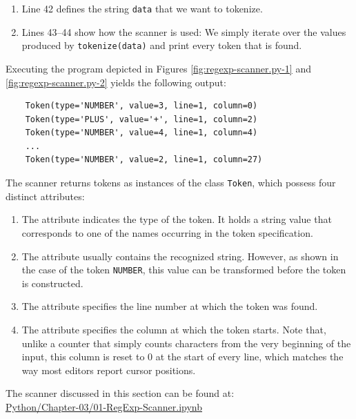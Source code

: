 \begin{enumerate}
\begin{enumerate}
            the next match.
      \item Lines 38--39 deal with the token \texttt{MISMATCH}: an exception is raised that reports the illegal
            character together with the line and column at which it was found.
      \item Line 40 is only reached for genuine tokens.  It constructs a \texttt{Token} object and
            \texttt{yield}s it to the caller.
      \end{enumerate}
\item Line 42 defines the string \texttt{data} that we want to tokenize.
\item Lines 43--44 show how the scanner is used: We simply iterate over the values produced by
      \texttt{tokenize(data)} and print every token that is found.
\end{enumerate}

\noindent
Executing the program depicted in Figures \ref{fig:regexp-scanner.py-1}  and \ref{fig:regexp-scanner.py-2}
yields the following output: 

\begin{verbatim}
    Token(type='NUMBER', value=3, line=1, column=0)
    Token(type='PLUS', value='+', line=1, column=2)
    Token(type='NUMBER', value=4, line=1, column=4)
    ...
    Token(type='NUMBER', value=2, line=1, column=27)
\end{verbatim}
The scanner returns tokens as instances of the class \texttt{Token}, which possess four distinct attributes:
\begin{enumerate}
\item The  attribute indicates the type of the token. It holds a string value that
      corresponds to one of the names occurring in the token specification.
\item The  attribute usually contains the recognized string. However, as shown in the case
      of the token \texttt{NUMBER}, this value can be transformed before the token is constructed.
\item The  attribute specifies the line number at which the token was found.
\item The  attribute specifies the column at which the token starts.  Note that, unlike a
      counter that simply counts characters from the very beginning of the input, this column is reset to $0$ at
      the start of every line, which matches the way most editors report cursor positions.
\end{enumerate}
The scanner discussed in this section can be found at:
\\[0.2cm]
\hspace*{1.3cm}
\href{https://github.com/karlstroetmann/Formal-Languages/blob/master/Python/Chapter-03/01-RegExp-Scanner.ipynb}{Python/Chapter-03/01-RegExp-Scanner.ipynb}

